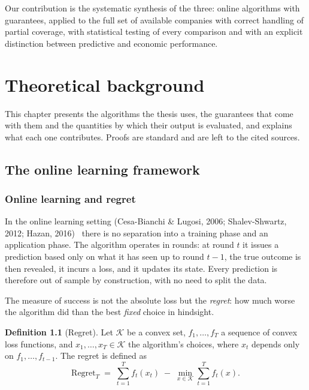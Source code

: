 \documentclass[12pt,a4paper,oneside]{report}
\renewcommand{\_}{\oldunderscore\allowbreak}
\theoremstyle{definition}
\newtheorem{definition}{Definition}[chapter]
\theoremstyle{plain}
\theoremstyle{definition}   %
\begin{document}
Our contribution is the systematic synthesis of the three: online algorithms with guarantees,
applied to the full set of available companies with correct handling of partial coverage, with
statistical testing of every comparison and with an explicit distinction between predictive
and economic performance.

\chapter{Theoretical background}
\label{ch:theory}

This chapter presents the algorithms the thesis uses, the guarantees that come with them and the
quantities by which their output is evaluated, and explains what each one contributes. Proofs are
standard and are left to the cited sources.

\section{The online learning framework}

\subsection{Online learning and regret}

In the online learning setting (Cesa-Bianchi \& Lugosi, 2006; Shalev-Shwartz, 2012; Hazan,
2016)~\cite{cesabianchi2006,shalevshwartz2012,hazan2016} there is no separation into a training
phase and an application phase. The algorithm operates in rounds: at round $t$ it issues a prediction based only on
what it has seen up to round $t-1$, the true outcome is then revealed, it incurs a loss, and
it updates its state. Every prediction is therefore out of sample by construction, with no
need to split the data.

The measure of success is not the absolute loss but the \emph{regret}: how much worse the
algorithm did than the best \emph{fixed} choice in hindsight.

\begin{definition}[Regret]
Let $\mathcal{K}$ be a convex set, $f_1,\dots,f_T$ a sequence of convex loss functions, and
$x_1,\dots,x_T \in \mathcal{K}$ the algorithm's choices, where $x_t$ depends only on
$f_1,\dots,f_{t-1}$. The regret is defined as
\[
\mathrm{Regret}_T \;=\; \sum_{t=1}^{T} f_t(x_t) \;-\; \min_{x \in \mathcal{K}} \sum_{t=1}^{T} f_t(x).
\]
\end{definition}
\end{document}
